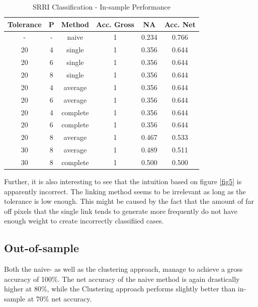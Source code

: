 \documentclass[aodsor,preprint]{imsart}
\numberwithin{equation}{section}
\theoremstyle{plain}
\begin{document}
\begin{table}[H]
	\begin{center}
		\caption{SRRI Classification - In-sample Performance}
		\begin{tabular}{|c|c|c|c|c|c|}
			\hline
			Tolerance & P & Method & Acc. Gross & NA & Acc. Net\\
			\hline
			- & - & naive & 1 & 0.234 & 0.766\\
			\hline
			 20 & 4 & single & 1 & 0.356 & 0.644\\
			\hline
			 20 & 6 & single & 1 & 0.356 & 0.644 \\
			\hline
			 20 & 8 & single & 1 & 0.356 & 0.644 \\
			\hline
			 20 & 4 & average & 1 & 0.356 & 0.644\\
			\hline
			 20 & 6 & average & 1 & 0.356 & 0.644\\
			\hline
			 20 & 4 & complete & 1 & 0.356 & 0.644\\
			\hline
			 20 & 6 & complete & 1 & 0.356 & 0.644\\
			\hline
			 20 & 8 & average & 1 & 0.467 & 0.533\\
			\hline
			 30 & 8 & average & 1 & 0.489 & 0.511\\
			\hline
			 30 & 8 & complete & 1 & 0.500 & 0.500\\
			\hline
		\end{tabular}
	\end{center}
\end{table}

Further, it is also interesting to see that the intuition based on figure \ref{fig5} is apparently incorrect. The linking method seems to be irrelevant as long as the tolerance is low enough. This might be caused by the fact that the amount of far off pixels that the single link tends to generate more frequently do not have enough weight to create incorrectly classifiied cases.

\subsection{Out-of-sample}
Both the naive- as well as the clustering approach, manage to achieve a gross accuracy of 100\%. The net accuracy of the naive method is again drastically higher at 80\%, while the Clustering approach performs slightly better than in-sample at 70\% net accuracy.
\end{document}
